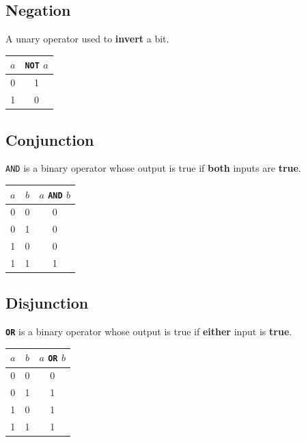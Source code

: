\documentclass{report}
\newcommand{\keywordinline}[1]{\textcolor[rgb]{0.00,0.50,0.00}{\textbf{\texttt{#1}}}}
\begin{document}
\subsection{Negation}
A unary operator used to \textbf{invert} a bit.
\begin{table}[H]
    \centering
    \begin{tabular}{c c}
        \toprule
        \textbf{\(a\)} & \keywordinline{NOT} \(a\) \\
        \midrule
        0              & 1                         \\
        1              & 0                         \\
        \bottomrule
    \end{tabular}
\end{table}
\subsection{Conjunction}
\texttt{AND} is a binary operator whose output is true if \textbf{both} inputs are \textbf{true}.
\begin{table}[H]
    \centering
    \begin{tabular}{c c c}
        \toprule
        \textbf{\(a\)} & \textbf{\(b\)} & \textbf{\(a\) \texttt{AND} \(b\)} \\
        \midrule
        0              & 0              & 0                                           \\
        0              & 1              & 0                                           \\
        1              & 0              & 0                                           \\
        1              & 1              & 1                                           \\
        \bottomrule
    \end{tabular}
\end{table}
\subsection{Disjunction}
\keywordinline{OR} is a binary operator whose output is true if \textbf{either} input is \textbf{true}.
\begin{table}[H]
    \centering
    \begin{tabular}{c c c}
        \toprule
        \textbf{\(a\)} & \textbf{\(b\)} & \(a\) \keywordinline{OR} \(b\) \\
        \midrule
        0              & 0              & 0                              \\
        0              & 1              & 1                              \\
        1              & 0              & 1                              \\
        1              & 1              & 1                              \\
        \bottomrule
    \end{tabular}
\end{table}
\end{document}
